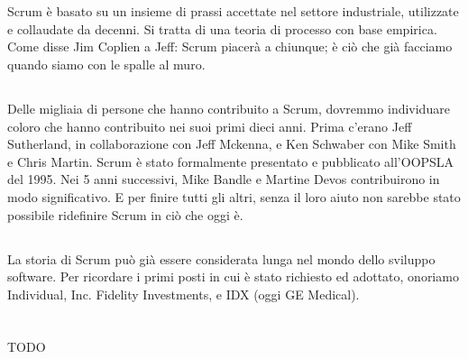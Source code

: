 \section*{\color{Blue}{RINGRAZIAMENTI}}
\label{sec:acknowledgements}

\subsection*{\color{Blue}{GENERALI}}
\label{sec:general}
Scrum \`e basato su un insieme di prassi accettate nel settore industriale, utilizzate e collaudate da decenni. Si
tratta di una teoria di processo con base empirica. Come disse Jim Coplien a Jeff: \flqq Scrum piacer\`a a chiunque; \`e
ci\`o che gi\`a facciamo quando siamo con le spalle al muro.\frqq

\subsection*{\color{Blue}{PERSONE}}
\label{sec:people}
Delle migliaia di persone che hanno contribuito a Scrum, dovremmo individuare coloro che hanno contribuito nei suoi
primi dieci anni. Prima c'erano Jeff Sutherland, in collaborazione con Jeff Mckenna, e Ken Schwaber con Mike Smith e
Chris Martin. Scrum \`e stato formalmente presentato e pubblicato all'OOPSLA del 1995. Nei 5 anni successivi, Mike
Bandle e Martine Devos contribuirono in modo significativo. E per finire tutti gli altri, senza il loro aiuto non
sarebbe stato possibile ridefinire Scrum in ci\`o che oggi \`e.

\subsection*{\color{Blue}{STORIA}}
\label{sec:history}
La storia di Scrum pu\`o gi\`a essere considerata lunga nel mondo dello sviluppo software. Per ricordare i primi posti
in cui \`e stato richiesto ed adottato, onoriamo Individual, Inc. Fidelity Investments, e IDX (oggi GE Medical).

\section*{\color{Blue}{NOTE ALLA VERSIONE ITALIANA}}
\label{sec:italianversion}
TODO